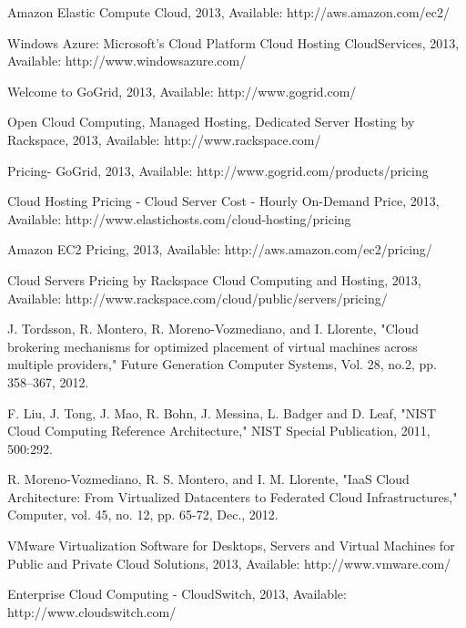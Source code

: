 \documentclass[conference]{IEEEtran}
\begin{document}
\begin{thebibliography}{4}



 Amazon Elastic Compute Cloud, 2013, Available: http://aws.amazon.com/ec2/

 Windows Azure: Microsoft's Cloud Platform  Cloud Hosting  CloudServices, 2013, Available: http://www.windowsazure.com/

 Welcome to GoGrid, 2013, Available: http://www.gogrid.com/

 Open Cloud Computing, Managed Hosting, Dedicated Server Hosting by Rackspace, 2013, Available: http://www.rackspace.com/

 Pricing- GoGrid, 2013,  Available: http://www.gogrid.com/products/pricing

 Cloud Hosting Pricing - Cloud Server Cost - Hourly On-Demand Price, 2013, Available: http://www.elastichosts.com/cloud-hosting/pricing 

 Amazon EC2 Pricing, 2013, Available: http://aws.amazon.com/ec2/pricing/

 Cloud Servers Pricing by Rackspace Cloud Computing and Hosting, 2013, Available: http://www.rackspace.com/cloud/public/servers/pricing/ 

 J. Tordsson, R. Montero, R. Moreno-Vozmediano, and I. Llorente, "Cloud brokering mechanisms for optimized placement of virtual machines across multiple providers," Future Generation Computer Systems, Vol. 28, no.2, pp. 358--367, 2012.

  F. Liu, J. Tong, J. Mao, R. Bohn, J. Messina, L. Badger and D. Leaf, "NIST Cloud Computing Reference Architecture," NIST Special Publication, 2011, 500:292.

R. Moreno-Vozmediano, R. S. Montero, and I. M. Llorente, "IaaS Cloud Architecture: From Virtualized Datacenters to Federated Cloud Infrastructures," Computer, vol. 45, no. 12, pp. 65-72, Dec., 2012.


 VMware Virtualization Software for Desktops, Servers and Virtual Machines for Public and Private Cloud Solutions, 2013, Available: http://www.vmware.com/

 Enterprise Cloud Computing - CloudSwitch, 2013, Available: http://www.cloudswitch.com/


\end{thebibliography}
\end{document}
